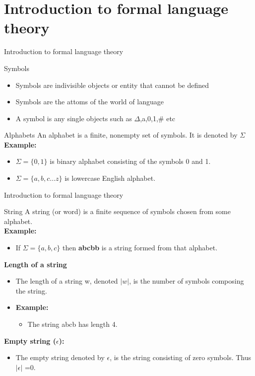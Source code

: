 \documentclass{beamer}
\begin{document}
\section{Introduction to formal language theory}
\begin{frame}{Introduction to formal language theory}
	\begin{block}{Symbols}
		\begin{itemize}
		\item Symbols are indivisible objects or entity that cannot be defined
		\item Symbols are the attoms of the world of language
		\item A symbol is any single objects such as $\Delta$,a,0,1,\# etc
	\end{itemize}
	\end{block}

	\begin{block}{Alphabets}
	An alphabet is a finite, nonempty set of symbols. It is denoted by $\Sigma$\\
	\textbf{Example:}
	\begin{itemize}
		\item $\Sigma= \{0, 1\}$ is binary alphabet consisting of the symbols 0 and 1.
		\item $\Sigma= \{a, b, c ...z\}$ is lowercase English alphabet.
	\end{itemize}
	\end{block}
\end{frame}
\begin{frame}{Introduction to formal language theory}
	\begin{block}{String}
		A string (or word) is a finite sequence of symbols chosen from some alphabet.\\
		\textbf{Example:}
		\begin{itemize}
			 
			 \item If $\Sigma = \{a, b, c\}$ then \textbf{abcbb} is a string formed from that alphabet.
		 		\end{itemize}
	\end{block}
	\textbf{Length of a string }
	\begin{itemize}
		\item The length of a string w, denoted $|w|$, is the number of symbols 
		composing the string.
		\item \textbf{Example:}
		\begin{itemize}
			\item The string abcb has length 4.
		\end{itemize}
	\end{itemize}

\textbf{Empty string ($\epsilon$):}
\begin{itemize}
	\item The empty string denoted by $\epsilon$, is the string consisting of zero symbols.
	Thus $|\epsilon|$ =0.

\end{itemize}
\end{frame}
\end{document}
